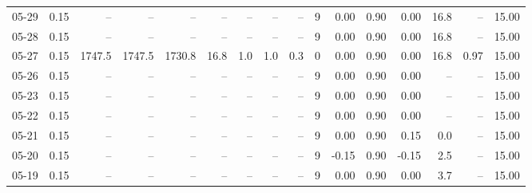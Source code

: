 \begin{threeparttable}
{\begin{tabular}{lrrrrrrrrrrrrrrr}
  05-29 &     0.15 &     -- &     -- &     -- &         -- &             -- &                       -- &                  -- &              9 &       0.00 &      0.90 &           0.00 &             16.8 &              -- &                  15.00 \\
  05-28 &     0.15 &     -- &     -- &     -- &         -- &             -- &                       -- &                  -- &              9 &       0.00 &      0.90 &           0.00 &             16.8 &              -- &                  15.00 \\
  05-27 &     0.15 & 1747.5 & 1747.5 & 1730.8 &       16.8 &            1.0 &                      1.0 &                 0.3 &              0 &       0.00 &      0.90 &           0.00 &             16.8 &            0.97 &                  15.00 \\
  05-26 &     0.15 &     -- &     -- &     -- &         -- &             -- &                       -- &                  -- &              9 &       0.00 &      0.90 &           0.00 &               -- &              -- &                  15.00 \\
  05-23 &     0.15 &     -- &     -- &     -- &         -- &             -- &                       -- &                  -- &              9 &       0.00 &      0.90 &           0.00 &               -- &              -- &                  15.00 \\
  05-22 &     0.15 &     -- &     -- &     -- &         -- &             -- &                       -- &                  -- &              9 &       0.00 &      0.90 &           0.00 &               -- &              -- &                  15.00 \\
  05-21 &     0.15 &     -- &     -- &     -- &         -- &             -- &                       -- &                  -- &              9 &       0.00 &      0.90 &           0.15 &              0.0 &              -- &                  15.00 \\
  05-20 &     0.15 &     -- &     -- &     -- &         -- &             -- &                       -- &                  -- &              9 &      -0.15 &      0.90 &          -0.15 &              2.5 &              -- &                  15.00 \\
  05-19 &     0.15 &     -- &     -- &     -- &         -- &             -- &                       -- &                  -- &              9 &       0.00 &      0.90 &           0.00 &              3.7 &              -- &                  15.00 \\

\end{tabular}}
\end{threeparttable}
